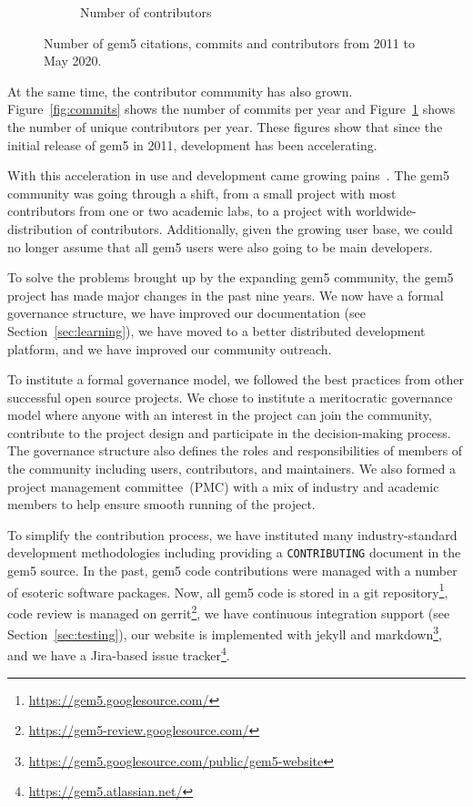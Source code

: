 \begin{figure}
\begin{subfigure}{0.28\linewidth}
      \caption{Number of contributors}
      \label{fig:contributors}
    \end{subfigure}
    \caption{Number of gem5 citations, commits and contributors from 2011 to May 2020.}
    \label{fig:gem5_citations_commits_contributors}
\end{figure}

At the same time, the contributor community has also grown.
Figure~\ref{fig:commits} shows the number of commits per year and Figure~\ref{fig:contributors} shows the number of unique contributors per year.
These figures show that since the initial release of gem5 in 2011, development has been accelerating.

With this acceleration in use and development came growing pains~\cite{Power-gem5horrors-2015}.
The gem5 community was going through a shift, from a small project with most contributors from one or two academic labs, to a project with worldwide-distribution of contributors.
Additionally, given the growing user base, we could no longer assume that all gem5 users were also going to be main developers.

To solve the problems brought up by the expanding gem5 community, the gem5 project has made major changes in the past nine years.
We now have a formal governance structure, we have improved our documentation (see Section~\ref{sec:learning}), we have moved to a better distributed development platform, and we have improved our community outreach.

To institute a formal governance model, we followed the best practices from other successful open source projects.
We chose to institute a meritocratic governance model where anyone with an interest in the project can join the community, contribute to the project design and participate in the decision-making process.
The governance structure also defines the roles and responsibilities of members of the community including users, contributors, and maintainers.
We also formed a project management committee~(PMC) with a mix of industry and academic members to help ensure smooth running of the project.

To simplify the contribution process, we have instituted many industry-standard development methodologies including providing a \verb|CONTRIBUTING| document in the gem5 source.
In the past, gem5 code contributions were managed with a number of esoteric software packages.
Now, all gem5 code is stored in a git repository\footnote{\url{https://gem5.googlesource.com/}}, code review is managed on gerrit\footnote{\url{https://gem5-review.googlesource.com/}}, we have continuous integration support (see Section~\ref{sec:testing}), our website is implemented with jekyll and markdown\footnote{\url{https://gem5.googlesource.com/public/gem5-website}}, and we have a Jira-based issue tracker\footnote{\url{https://gem5.atlassian.net/}}.

